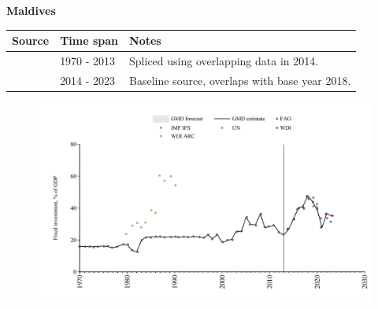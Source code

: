 \documentclass[12pt,a4paper,landscape]{article}
\begin{document}
\begin{adjustbox}{max totalsize={\paperwidth}{\paperheight},center}
\begin{minipage}[t][\textheight][t]{\textwidth}
\vspace*{0.5cm}
{}
\begin{center}
{\Large\bfseries Maldives}
\end{center}
\vspace{0.5cm}
\begin{table}[H]
\centering
\small
\begin{tabular}{|l|l|l|}
\hline
\textbf{Source} & \textbf{Time span} & \textbf{Notes} \\
\hline
\rowcolor{white}\cite{UN}& 1970 - 2013 &Spliced using overlapping data in 2014.\\
\rowcolor{lightgray}\cite{WDI}& 2014 - 2023 &Baseline source, overlaps with base year 2018.\\
\hline
\end{tabular}
\end{table}
\begin{figure}[H]
\centering
\includegraphics[width=\textwidth,height=0.6\textheight,keepaspectratio]{graphs/MDV_finv_GDP.pdf}
\end{figure}
\end{minipage}
\end{adjustbox}
\end{document}
